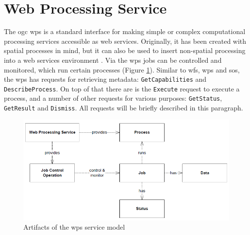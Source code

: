 \section{Web Processing Service}
The \ac{ogc} \acl{wps} is a standard interface for making simple or complex computational processing services accessible as web services. Originally, it has been created with spatial processes in mind, but it can also be used to insert non-spatial processing into a web services environment \citep[p. 8]{GEO:OGC}. Via the \ac{wps} jobs can be controlled and monitored, which run certain processes (Figure \ref{fig:WPSmodel}). Similar to \ac{wfs}, \ac{wps} and \ac{sos}, the \ac{wps} has requests for retrieving metadata: \texttt{GetCapabilities} and \texttt{DescribeProcess}. On top of that there are is the \texttt{Execute} request to execute a process, and a number of other requests for various purposes: \texttt{GetStatus}, \texttt{GetResult} and \texttt{Dismiss}. All requests will be briefly described in this paragraph.  

\begin{figure}
	\centering
	\includegraphics[width=1\linewidth]{UML/WPSmodel.png}
	\caption{Artifacts of the \ac{wps} service model \citep[p. 15]{GEO:OGC}}
	\label{fig:WPSmodel}
\end{figure}


